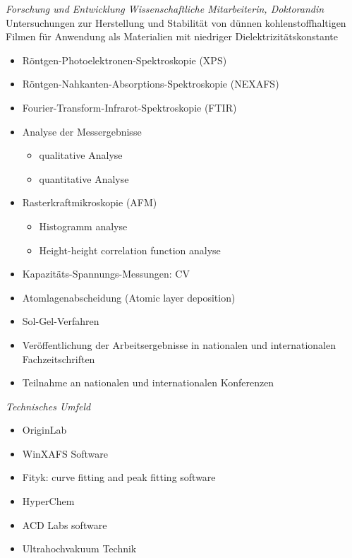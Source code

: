 \documentclass[11pt,a4paper,sans]{moderncv} %
\begin{document}
{
\emph{Forschung und Entwicklung \newline Wissenschaftliche Mitarbeiterin, Doktorandin} 
\newline \newline Untersuchungen zur Herstellung und Stabilität von dünnen kohlenstoffhaltigen Filmen für Anwendung als Materialien mit niedriger Dielektrizitätskonstante
\newline
\begin{itemize}
	\item Röntgen-Photoelektronen-Spektroskopie (XPS)
	\item Röntgen-Nahkanten-Absorptions-Spektroskopie (NEXAFS)
	\item Fourier-Transform-Infrarot-Spektroskopie (FTIR)
	\item Analyse der Messergebnisse
	\begin{itemize}
		\item qualitative Analyse
		\item quantitative Analyse
	\end{itemize}
	\item Rasterkraftmikroskopie (AFM)
	\begin{itemize}
		\item Histogramm analyse
		\item Height-height correlation function analyse  
	\end{itemize}
	\item Kapazitäts-Spannungs-Messungen: CV  
	\item Atomlagenabscheidung (Atomic layer deposition) 
	\item Sol-Gel-Verfahren  
	\item Veröffentlichung der Arbeitsergebnisse in nationalen und internationalen Fachzeitschriften 
	\item Teilnahme an nationalen und internationalen Konferenzen\newline    
\end{itemize} 
\emph{Technisches Umfeld \newline}
\begin{itemize}
	\item OriginLab
	\item WinXAFS Software 
	\item Fityk: curve fitting and peak fitting software 
	\item HyperChem 
	\item ACD Labs software 
	\item Ultrahochvakuum Technik 
\end{itemize}
}  
\end{document}
